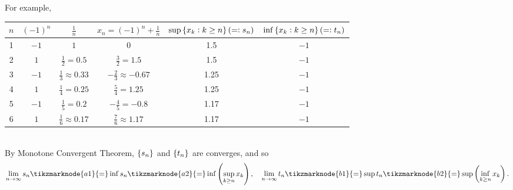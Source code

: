 \documentclass[11pt,openany]{article}
\begin{document}
\begin{observation}
For example,
\begin{table}[h]
\centering{}
\begin{tabular}{c|cc|c||cc}
	\toprule
	\(n\) & \((-1)^n\) & \(\frac{1}{n}\) & \(x_n=(-1)^n + \frac{1}{n}\) & $\sup\set{x_k:k\geq n}(=:s_n)$ & $\inf\set{x_k:k\geq n}(=:t_n)$ \\
	\midrule
	1  & \(-1\)   & \(1\)       & \(0\) & 1.5 & $-1$ \\
	2  & \(1\)    & \(\tfrac{1}{2}=0.5\)  & \(\tfrac{3}{2}=1.5\) & 1.5 & $-1$   \\
	3  & \(-1\)   & \(\tfrac{1}{3}\approx 0.33\)  & \(-\tfrac{2}{3}\approx -0.67\) & 1.25 & $-1$  \\
	4  & \(1\)    & \(\tfrac{1}{4}=0.25\)  & \(\tfrac{5}{4}=1.25\) & 1.25 & $-1$   \\
	5  & \(-1\)   & \(\tfrac{1}{5}=0.2\)  & \(-\tfrac{4}{5}=-0.8\) & 1.17 & $-1$  \\
	6  & \(1\)    & \(\tfrac{1}{6}\approx 0.17\)  & \(\tfrac{7}{6}\approx 1.17\) & 1.17 & $-1$   \\
	\bottomrule
\end{tabular}
\end{table}\\ 
By Monotone Convergent Theorem, $\set{s_n}$ and $\set{t_n}$ are converges, and so \begin{align*}
	\lim\limits_{n \to \infty}s_n\tikzmarknode{a1}{=}\inf s_n\tikzmarknode{a2}{=}\inf\left(\sup_{k\geq n}x_k\right),\quad \lim\limits_{n \to \infty}t_n\tikzmarknode{b1}{=}\sup t_n\tikzmarknode{b2}{=}\sup\left(\inf_{k\geq n}x_k\right).
\end{align*}
\end{observation}
\end{document}
